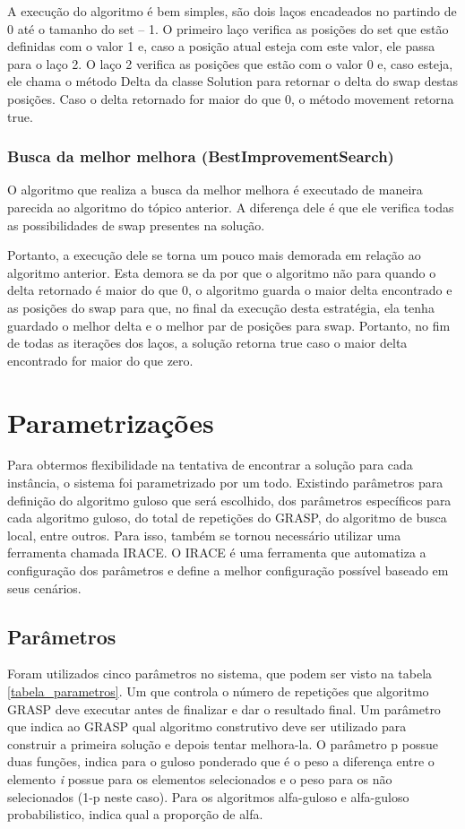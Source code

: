 \documentclass[12pt]{article}
\begin{document}
A execução do algoritmo é bem simples, são dois laços encadeados no partindo de 0 até o tamanho do set – 1. O primeiro laço verifica as posições do set que estão definidas com o valor 1 e, caso a posição atual esteja com este valor, ele passa para o laço 2. O laço 2 verifica as posições que estão com o valor 0 e, caso esteja, ele chama o método Delta da classe Solution para retornar o delta do swap destas posições. Caso o delta retornado for maior do que 0, o método movement retorna true.

\subsubsection{Busca da melhor melhora (BestImprovementSearch)}\label{bis}
O algoritmo que realiza a busca da melhor melhora é executado de maneira parecida ao algoritmo do tópico anterior. A diferença dele é que ele verifica todas as possibilidades de swap presentes na solução. 

Portanto, a execução dele se torna um pouco mais demorada em relação ao algoritmo anterior. Esta demora se da por que o algoritmo não para quando o delta retornado é maior do que 0, o algoritmo guarda o maior delta encontrado e as posições do swap para que, no final da execução desta estratégia, ela tenha guardado o melhor delta e o melhor par de posições para swap. Portanto, no fim de todas as iterações dos laços, a solução retorna true caso o maior delta encontrado for maior do que zero.

\section{Parametrizações}
Para obtermos flexibilidade na tentativa de encontrar a solução para cada instância, o sistema foi parametrizado por um todo. Existindo parâmetros para definição do algoritmo guloso que será escolhido, dos parâmetros específicos para cada algoritmo guloso, do total de repetições do GRASP, do algoritmo de busca local, entre outros.
Para isso, também se tornou necessário utilizar uma ferramenta chamada IRACE. O IRACE é uma ferramenta que automatiza a configuração dos parâmetros e define a melhor configuração possível baseado em seus cenários.

\subsection{Parâmetros}

Foram utilizados cinco parâmetros no sistema, que podem ser visto na tabela \ref{tabela_parametros}. Um que controla o número de repetições que algoritmo GRASP deve executar antes de finalizar e dar o resultado final. Um parâmetro que indica ao GRASP qual algoritmo construtivo deve ser utilizado para construir a primeira solução e depois tentar melhora-la. O parâmetro p possue duas funções, indica para o guloso ponderado que é o peso a diferença entre o elemento \textit{i} possue para os elementos selecionados e o peso para os não selecionados (1-p neste caso). Para os algoritmos alfa-guloso e alfa-guloso probabilistico, indica qual a proporção de alfa.
\end{document}
